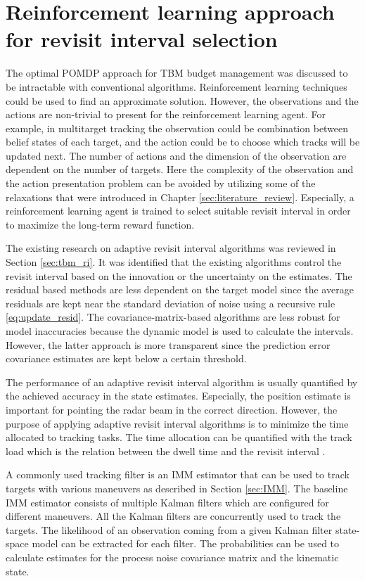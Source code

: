 \documentclass[english, 12pt, a4paper, elec, utf8, a-1b, online]{aaltothesis}
\begin{document}
\newpage
\section{Reinforcement learning approach for revisit interval selection}

The optimal POMDP approach for TBM budget management was discussed to be intractable with conventional algorithms.
Reinforcement learning techniques could be used to find an approximate solution.
However, the observations and the actions are non-trivial to present for the reinforcement learning agent.
For example, in multitarget tracking the observation could be combination between belief states of each target, and the action could be to choose which tracks will be updated next.
The number of actions and the dimension of the observation are dependent on the number of targets.
Here the complexity of the observation and the action presentation problem can be avoided by utilizing some of the relaxations that were introduced in Chapter \ref{sec:literature_review}.
Especially, a reinforcement learning agent is trained to select suitable revisit interval in order to maximize the long-term reward function.  

The existing research on adaptive revisit interval algorithms was reviewed in Section \ref{sec:tbm_ri}.
It was identified that the existing algorithms control the revisit interval based on the innovation or the uncertainty on the estimates.
The residual based methods are less dependent on the target model since the average residuals are kept near the standard deviation of noise using a recursive rule \eqref{eq:update_resid}.
The covariance-matrix-based algorithms are less robust for model inaccuracies because the dynamic model is used to calculate the intervals.
However, the latter approach is more transparent since the prediction error covariance estimates are kept below a certain threshold.

The performance of an adaptive revisit interval algorithm is usually quantified by the achieved accuracy in the state estimates.
Especially, the position estimate is important for pointing the radar beam in the correct direction.
However, the purpose of applying adaptive revisit interval algorithms is to minimize the time allocated to tracking tasks.
The time allocation can be quantified with the track load which is the relation between the dwell time and the revisit interval \cite{vanKeuk1993}.

A commonly used tracking filter is an IMM estimator that can be used to track targets with various maneuvers as described in Section \ref{sec:IMM}.
The baseline IMM estimator consists of multiple Kalman filters which are configured for different maneuvers.
All the Kalman filters are concurrently used to track the targets.
The likelihood of an observation coming from a given Kalman filter state-space model can be extracted for each filter.
The probabilities can be used to calculate estimates for the process noise covariance matrix and the kinematic state.
\end{document}
